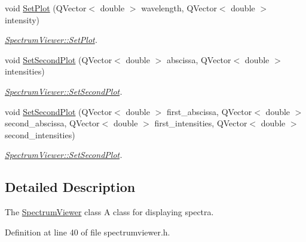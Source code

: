 \begin{DoxyCompactItemize}
\item 
void \hyperlink{class_spectrum_viewer_aec1ee2ca153eba1a3fd38af1c9ae0dc6}{Set\+Plot} (Q\+Vector$<$ double $>$ wavelength, Q\+Vector$<$ double $>$ intensity)
\begin{DoxyCompactList}\small\item\em \hyperlink{class_spectrum_viewer_aec1ee2ca153eba1a3fd38af1c9ae0dc6}{Spectrum\+Viewer\+::\+Set\+Plot}. \end{DoxyCompactList}\item 
void \hyperlink{class_spectrum_viewer_a0741973183e8cbefaff7264eba320521}{Set\+Second\+Plot} (Q\+Vector$<$ double $>$ abscissa, Q\+Vector$<$ double $>$ intensities)
\begin{DoxyCompactList}\small\item\em \hyperlink{class_spectrum_viewer_a0741973183e8cbefaff7264eba320521}{Spectrum\+Viewer\+::\+Set\+Second\+Plot}. \end{DoxyCompactList}\item 
void \hyperlink{class_spectrum_viewer_a95fcf356e6842b634d6a3229a487b364}{Set\+Second\+Plot} (Q\+Vector$<$ double $>$ first\+\_\+abscissa, Q\+Vector$<$ double $>$ second\+\_\+abscissa, Q\+Vector$<$ double $>$ first\+\_\+intensities, Q\+Vector$<$ double $>$ second\+\_\+intensities)
\begin{DoxyCompactList}\small\item\em \hyperlink{class_spectrum_viewer_a0741973183e8cbefaff7264eba320521}{Spectrum\+Viewer\+::\+Set\+Second\+Plot}. \end{DoxyCompactList}\end{DoxyCompactItemize}


\subsection{Detailed Description}
The \hyperlink{class_spectrum_viewer}{Spectrum\+Viewer} class A class for displaying spectra. 

Definition at line 40 of file spectrumviewer.\+h.



